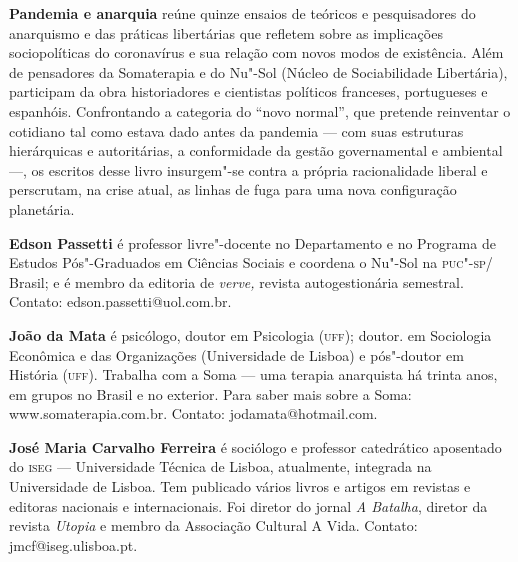 
\textbf{Pandemia e anarquia} reúne quinze ensaios de teóricos e pesquisadores do anarquismo e das práticas libertárias que refletem sobre as implicações sociopolíticas do coronavírus e sua relação com novos modos de existência. Além de pensadores da Somaterapia e do Nu"-Sol (Núcleo de Sociabilidade Libertária), participam da obra historiadores e cientistas políticos franceses, portugueses e espanhóis. Confrontando a categoria do ``novo normal'', que pretende reinventar o cotidiano tal como estava dado antes da pandemia --- com suas estruturas hierárquicas e autoritárias, a conformidade da gestão governamental e ambiental ---, os escritos desse livro insurgem"-se contra a própria racionalidade liberal e perscrutam, na crise atual, as linhas de fuga para uma nova configuração planetária.


\textbf{Edson Passetti} é professor livre"-docente no Departamento e no
Programa de Estudos Pós"-Graduados em Ciências Sociais e coordena o
Nu"-Sol na \textsc{puc"-sp}/ Brasil; e é membro da editoria de \emph{verve,} revista autogestionária semestral. Contato: edson.passetti@uol.com.br.

\textbf{João da Mata} é psicólogo, doutor em Psicologia (\textsc{uff}); doutor.
em Sociologia Econômica e das Organizações (Universidade de Lisboa) e
pós"-doutor em História (\textsc{uff}). Trabalha com a Soma --- uma terapia
anarquista há trinta anos, em grupos no Brasil e no exterior. Para saber
mais sobre a Soma:
www.somaterapia.com.br. Contato:
jodamata@hotmail.com.

\textbf{José Maria Carvalho Ferreira} é sociólogo e professor
catedrático aposentado do \textsc{iseg} --- Universidade Técnica de Lisboa,
atualmente, integrada na Universidade de Lisboa. Tem publicado vários
livros e artigos em revistas e editoras nacionais e internacionais. Foi
diretor do jornal \emph{A Batalha}, diretor da revista \emph{Utopia} e
membro da Associação Cultural A Vida. Contato:
jmcf@iseg.ulisboa.pt.


